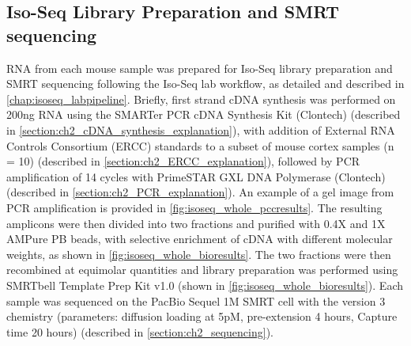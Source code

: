 \subsection{Iso-Seq Library Preparation and SMRT sequencing}\label{ch4_methods: isoseq_library}
RNA from each mouse sample was prepared for Iso-Seq library preparation and SMRT sequencing following the Iso-Seq lab workflow, as detailed and described in \cref{chap:isoseq_labpipeline}. Briefly, first strand cDNA synthesis was performed on 200ng RNA using the SMARTer PCR cDNA Synthesis Kit (Clontech) (described in \cref{section:ch2_cDNA_synthesis_explanation}), with addition of External RNA Controls Consortium (ERCC) standards to a subset of mouse cortex samples (n = 10) (described in \cref{section:ch2_ERCC_explanation}), followed by PCR amplification of 14 cycles with PrimeSTAR GXL DNA Polymerase (Clontech) (described in \cref{section:ch2_PCR_explanation}). An example of a gel image from PCR amplification is provided in \cref{fig:isoseq_whole_pccresults}. The resulting amplicons were then divided into two fractions and purified with 0.4X and 1X AMPure PB beads, with selective enrichment of cDNA with different molecular weights, as shown in \cref{fig:isoseq_whole_bioresults}. The two fractions were then recombined at equimolar quantities and library preparation was performed using SMRTbell Template Prep Kit v1.0 (shown in \cref{fig:isoseq_whole_bioresults}). Each sample was sequenced on the PacBio Sequel 1M SMRT cell with the version 3 chemistry (parameters: diffusion loading at 5pM, pre-extension 4 hours, Capture time 20 hours) (described in \cref{section:ch2_sequencing}).

